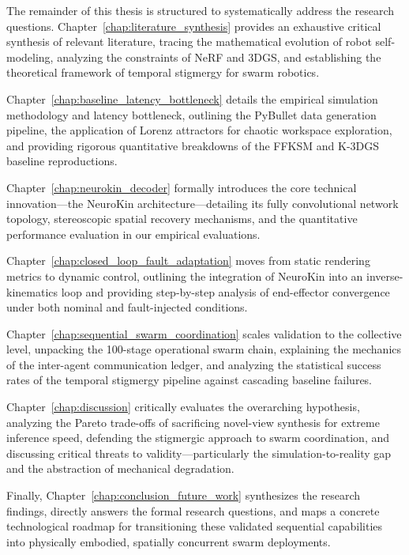 \documentclass[12pt,a4paper,oneside]{report}
\begin{document}
The remainder of this thesis is structured to systematically address the research questions. Chapter~\ref{chap:literature_synthesis} provides an exhaustive critical synthesis of relevant literature, tracing the mathematical evolution of robot self-modeling, analyzing the constraints of NeRF and 3DGS, and establishing the theoretical framework of temporal stigmergy for swarm robotics.

Chapter~\ref{chap:baseline_latency_bottleneck} details the empirical simulation methodology and latency bottleneck, outlining the PyBullet data generation pipeline, the application of Lorenz attractors for chaotic workspace exploration, and providing rigorous quantitative breakdowns of the FFKSM and K-3DGS baseline reproductions.

Chapter~\ref{chap:neurokin_decoder} formally introduces the core technical innovation—the NeuroKin architecture—detailing its fully convolutional network topology, stereoscopic spatial recovery mechanisms, and the quantitative performance evaluation in our empirical evaluations.

Chapter~\ref{chap:closed_loop_fault_adaptation} moves from static rendering metrics to dynamic control, outlining the integration of NeuroKin into an inverse-kinematics loop and providing step-by-step analysis of end-effector convergence under both nominal and fault-injected conditions.

Chapter~\ref{chap:sequential_swarm_coordination} scales validation to the collective level, unpacking the 100-stage operational swarm chain, explaining the mechanics of the inter-agent communication ledger, and analyzing the statistical success rates of the temporal stigmergy pipeline against cascading baseline failures.

Chapter~\ref{chap:discussion} critically evaluates the overarching hypothesis, analyzing the Pareto trade-offs of sacrificing novel-view synthesis for extreme inference speed, defending the stigmergic approach to swarm coordination, and discussing critical threats to validity—particularly the simulation-to-reality gap and the abstraction of mechanical degradation.

Finally, Chapter~\ref{chap:conclusion_future_work} synthesizes the research findings, directly answers the formal research questions, and maps a concrete technological roadmap for transitioning these validated sequential capabilities into physically embodied, spatially concurrent swarm deployments.
\end{document}
